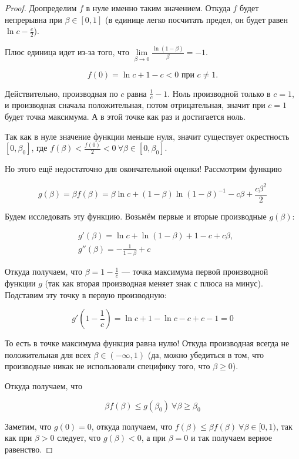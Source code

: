 \begin{proof}
  Доопределим $f$ в нуле именно таким значением. Откуда $f$ будет непрерывна
  при $\beta \in [0, 1]$ (в единице легко посчитать предел, он будет равен 
  $\ln c - \frac{c}{2}$).

  Плюс единица идет из-за того, что 
  $\lim\limits_{\beta \to 0} \frac{\ln (1 - \beta)}{\beta} = -1$.


  \[
    f(0) = \ln c + 1 - c < 0 \text{ при } c \neq 1.
  \]

  Действительно, производная по $c$ равна $\frac{1}{c} - 1$. Ноль производной
  только в $c = 1$, и производная сначала положительная, потом отрицательная,
  значит при $c = 1$ будет точка максимума. А в этой точке как раз и достигается
  ноль.

  Так как в нуле значение функции меньше нуля, значит существует окрестность
  $[0, \beta_0]$, где $f(\beta) < \frac{f(0)}{2} < 0 \ \forall \beta \in [0, \beta_0]$.

  Но этого ещё недостаточно для окончательной оценки! Рассмотрим функцию

  \[
    g(\beta) = \beta f(\beta) = \beta \ln c + (1 - \beta) \ln (1 - \beta)^{-1} - c\beta + \frac{c\beta^2}{2}
  \]

  Будем исследовать эту функцию. Возьмём первые и вторые производные $g(\beta)$:

  \begin{align}
    &g'(\beta) = \ln c + \ln (1 - \beta) + 1 - c + c\beta,\\
    &g''(\beta) = -\frac{1}{1 - \beta} + c
  \end{align}

  Откуда получаем, что $\beta = 1 - \frac1c$ --- точка максимума первой производной
  функции $g$ (так как вторая производная меняет знак с плюса на минус). Подставим эту
  точку в первую производную:

  \[
    g'\left(1 - \frac1c\right) = \ln c + 1 - \ln c - c + c - 1 = 0
  \]

  То есть в точке максимума функция равна нулю! Откуда производная всегда
  не положительная для всех $\beta \in (-\infty, 1)$ (да, можно убедиться в том,
  что производные никак не использовали специфику того, что $\beta \geq 0$).

  Откуда получаем, что

  \[
    \beta f(\beta) \leq g(\beta_0) \ \forall \beta \geq \beta_0 
  \]

  Заметим, что $g(0) = 0$, откуда получаем, что $f(\beta) \leq \beta f(\beta)
  \ \forall \beta \in [0, 1)$, так как при $\beta > 0$ следует, что $g(\beta) < 0$,
  а при $\beta = 0$ и так получаем верное равенство.


\end{proof}
